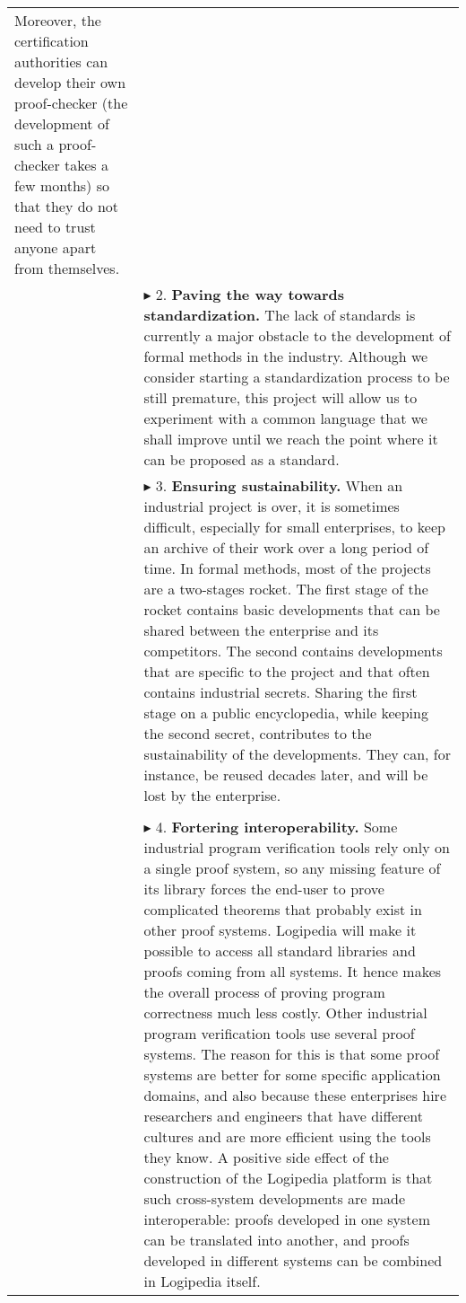 \begin{longtable}{|p{}|p{}|}
Moreover, the certification authorities can develop their own
proof-checker (the development of such a proof-checker takes a few
months) so that they do not need to trust anyone apart from themselves.\\
&
$\blacktriangleright$
2.
{\bf Paving the way towards standardization.}
The lack of standards is currently a major obstacle to the development
of formal methods in the industry. Although we consider starting a
standardization process to be still premature, this project will allow us
to experiment with a common language that we shall improve until we
reach the point where it can be proposed as a standard.\\
&
$\blacktriangleright$
3. 
{\bf Ensuring sustainability.}
When an industrial project is over, it is sometimes difficult,
especially for small enterprises, to keep an archive of their work over
a long period of time. In formal methods, most of the projects are a
two-stages rocket. The first stage of the rocket contains basic
developments that can be shared between the enterprise and its
competitors. The second contains developments that are specific to the
project and that often contains industrial secrets.
Sharing the first stage on a public encyclopedia, while keeping the
second secret, contributes to the sustainability of the
developments. They can, for instance, be reused decades later, and
will be lost by the enterprise.\\
&\\
&
$\blacktriangleright$
4.
{\bf Fortering interoperability.}
  Some industrial program verification tools rely only on a single
  proof system, so any missing feature of its library forces the
  end-user to prove complicated theorems that probably exist in other
  proof systems. Logipedia will make it possible to access all
  standard libraries and proofs coming from all systems. It hence
  makes the overall process of proving program correctness much less costly.
  Other industrial program verification tools use several proof
  systems. The reason for this is that some proof systems are better for some
  specific application domains, and also
  because these enterprises hire researchers and engineers that have
  different cultures and are more efficient using the tools they know.
  A positive side effect of the construction of the Logipedia platform is that
  such cross-system developments are made interoperable: proofs
  developed in one system can be translated into another, and
  proofs developed in different systems can be combined in
  Logipedia itself.\\

\end{longtable}
